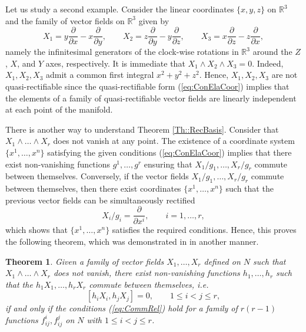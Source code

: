 \documentclass[12pt]{article}
\theoremstyle{plain}
\newtheorem{theorem}{Theorem}[section]
\theoremstyle{definition}
\numberwithin{equation}{section}
\begin{document}
Let us study a second example. Consider the linear coordinates $\{x,y,z\}$ on $\mathbb{R}^3$ and the family of vector fields on $\mathbb{R}^3$ given by
$$
X_1=y\frac{\partial}{\partial x}-x\frac{\partial}{\partial y},\qquad X_2=z\frac{\partial}{\partial y}-y\frac{\partial}{\partial z},\qquad X_3=x\frac{\partial}{\partial z}-z\frac{\partial}{\partial x},
$$
namely the infinitesimal generators of the clock-wise rotations in $\mathbb{R}^3$ around the $Z$, $X$, and $Y$ axes, respectively. It is immediate that $X_1\wedge X_2\wedge X_3=0$. Indeed, $X_1,X_2,X_3$ admit a common first integral $x^2+y^2+z^2$. Hence, $X_1,X_2,X_3$ are not quasi-rectifiable since the quasi-rectifiable form (\ref{eq:ConElaCoor}) implies that the elements of a family of quasi-rectifiable vector fields are linearly independent at each point of the manifold.



There is another way to understand Theorem \ref{Th::RecBasis}. Consider that $X_1\wedge\ldots\wedge X_r$  does not vanish at any point. The existence of a coordinate system $\{x^1,\ldots,x^n\}$ satisfying the given conditions (\ref{eq:ConElaCoor}) implies that there exist non-vanishing functions $g^1,\ldots,g^r$ ensuring that $X_1/g_1,\ldots,X_r/g_r$ commute between themselves. Conversely, if the vector fields $X_1/g_1,\ldots,X_r/g_r$ commute between themselves, then there exist coordinates $\{x^1,\ldots,x^n\}$ such that the previous vector fields can be simultaneously rectified
$$
X_i/g_i=\frac{\partial}{\partial x^i},\qquad i=1,\ldots,r,
$$
which shows that $\{x^1,\ldots,x^n\}$ satisfies the required conditions. Hence, this proves  the following theorem, which was demonstrated in \cite{GL23} in another manner.
\begin{theorem}\label{Th::InLiterature}
Given a family of vector fields $X_1,\ldots,X_r$ defined on   $N$ such that $X_1\wedge\ldots\wedge X_r$ does not vanish, there exist non-vanishing functions $h_1,\ldots,h_r$ such that the $h_1X_1,\ldots,h_rX_r$ commute between themselves, i.e.
$$
[h_iX_i,h_jX_j]=0,\qquad 1\leq i<j\leq r,
$$
if and only if the conditions (\ref{eq:CommRel}) hold for a family of $r(r-1)$ functions $f^i_{ij},f^j_{ij}$ on $N$ with  $1\leq i<j\leq r$.
\end{theorem}
\end{document}
